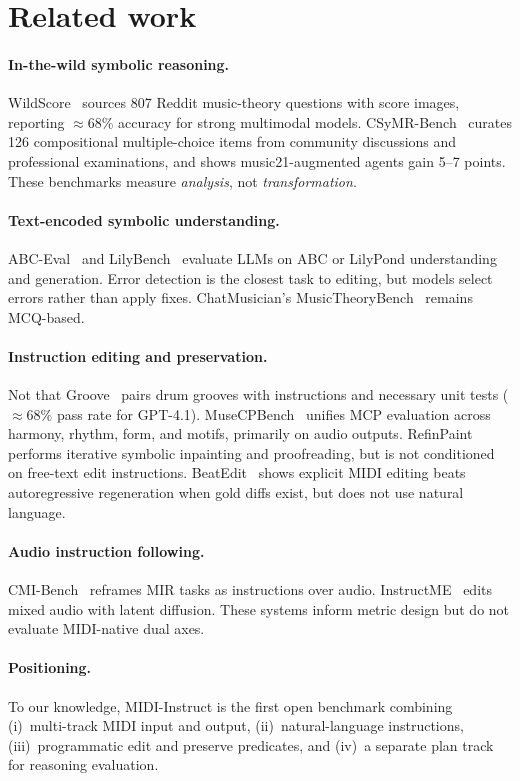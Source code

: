 \section{Related work}

\paragraph{In-the-wild symbolic reasoning.}
WildScore~\cite{mundada2025wildscore} sources 807 Reddit music-theory questions with score images, reporting $\approx$68\% accuracy for strong multimodal models. CSyMR-Bench~\cite{wang2026csymr} curates 126 compositional multiple-choice items from community discussions and professional examinations, and shows music21-augmented agents gain 5--7 points. These benchmarks measure \emph{analysis}, not \emph{transformation}.

\paragraph{Text-encoded symbolic understanding.}
ABC-Eval~\cite{zhao2025abceval} and LilyBench~\cite{spanio2026lilybench} evaluate LLMs on ABC or LilyPond understanding and generation. Error detection is the closest task to editing, but models select errors rather than apply fixes. ChatMusician's MusicTheoryBench~\cite{yuan2024chatmusician} remains MCQ-based.

\paragraph{Instruction editing and preservation.}
Not that Groove~\cite{groove2025} pairs drum grooves with instructions and necessary unit tests ($\approx$68\% pass rate for GPT-4.1). MuseCPBench~\cite{vishe2025musecpbench} unifies MCP evaluation across harmony, rhythm, form, and motifs, primarily on audio outputs. RefinPaint~\cite{ramoneda2024refinpaint} performs iterative symbolic inpainting and proofreading, but is not conditioned on free-text edit instructions. BeatEdit~\cite{gu2026beatedit} shows explicit MIDI editing beats autoregressive regeneration when gold diffs exist, but does not use natural language.

\paragraph{Audio instruction following.}
CMI-Bench~\cite{ma2025cmibench} reframes MIR tasks as instructions over audio. InstructME~\cite{lv2024instructme} edits mixed audio with latent diffusion. These systems inform metric design but do not evaluate MIDI-native dual axes.

\paragraph{Positioning.}
To our knowledge, MIDI-Instruct is the first open benchmark combining (i)~multi-track MIDI input and output, (ii)~natural-language instructions, (iii)~programmatic edit and preserve predicates, and (iv)~a separate plan track for reasoning evaluation.
